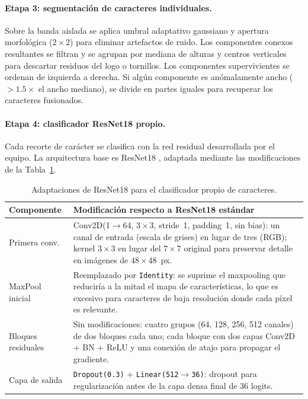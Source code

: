 \documentclass[11pt]{article}
\begin{document}
\paragraph{Etapa 3: segmentación de caracteres individuales.}
Sobre la banda aislada se aplica umbral adaptativo gaussiano y apertura morfológica
($2\times2$) para eliminar artefactos de ruido. Los componentes conexos resultantes
se filtran y se agrupan por mediana de alturas y centros verticales para descartar
residuos del logo o tornillos. Los componentes supervivientes se ordenan de izquierda a
derecha. Si algún componente es anómalamente ancho ($>1.5\times$ el ancho mediano), se
divide en partes iguales para recuperar los caracteres fusionados.

\paragraph{Etapa 4: clasificador ResNet18 propio.}
Cada recorte de carácter se clasifica con la red residual desarrollada por el equipo.
La arquitectura base es ResNet18 \cite{resnet}, adaptada mediante las modificaciones de
la Tabla~\ref{tab:cnn_arch}.

\begin{table}[H]
    \centering
    \caption{Adaptaciones de ResNet18 para el clasificador propio de caracteres.}
    \label{tab:cnn_arch}
    \renewcommand{\arraystretch}{1.2}
    \begin{tabular}{>{\raggedright\arraybackslash}p{3.5cm}
                    >{\raggedright\arraybackslash}p{10.2cm}}
        \toprule
        \textbf{Componente} & \textbf{Modificación respecto a ResNet18 estándar} \\
        \midrule
        Primera conv.\ & Conv2D(1$\to$64, $3\times3$, stride~1, padding~1, sin bias):
        un canal de entrada (escala de grises) en lugar de tres (RGB); kernel $3\times3$
        en lugar del $7\times7$ original para preservar detalle en imágenes de $48\times48$~px. \\
        MaxPool inicial & Reemplazado por \texttt{Identity}: se suprime el maxpooling que
        reduciría a la mitad el mapa de características, lo que es excesivo para
        caracteres de baja resolución donde cada píxel es relevante. \\
        Bloques residuales & Sin modificaciones: cuatro grupos (64, 128, 256, 512
        canales) de dos bloques cada uno; cada bloque con dos capas Conv2D + BN + ReLU
        y una conexión de atajo para propagar el gradiente. \\
        Capa de salida & \texttt{Dropout(0.3)} + \texttt{Linear(512$\to$36)}: dropout
        para regularización antes de la capa densa final de 36 logits. \\
        \bottomrule
    \end{tabular}
\end{table}
\end{document}
